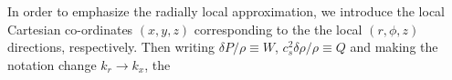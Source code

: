 In order to emphasize the radially local approximation, we introduce
the local Cartesian co-ordinates $(x,y,z)$ corresponding to the the
local $(r,\phi,z)$ directions, respectively.  
Then writing $\delta P /\rho \equiv W$, $c_s^2\delta\rho/\rho\equiv
Q$ and making the notation change $k_r\to k_x$,  the
